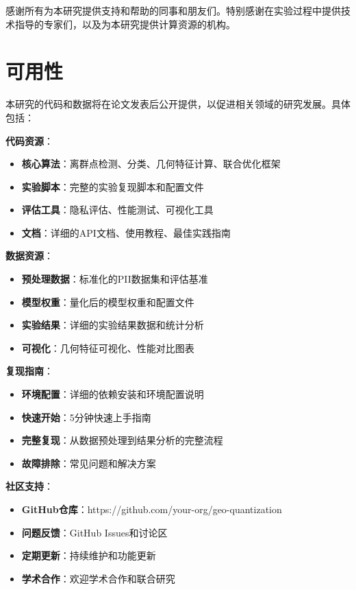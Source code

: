 感谢所有为本研究提供支持和帮助的同事和朋友们。特别感谢在实验过程中提供技术指导的专家们，以及为本研究提供计算资源的机构。

\section*{可用性}

本研究的代码和数据将在论文发表后公开提供，以促进相关领域的研究发展。具体包括：

\textbf{代码资源}：
\begin{itemize}
\item \textbf{核心算法}：离群点检测、分类、几何特征计算、联合优化框架
\item \textbf{实验脚本}：完整的实验复现脚本和配置文件
\item \textbf{评估工具}：隐私评估、性能测试、可视化工具
\item \textbf{文档}：详细的API文档、使用教程、最佳实践指南
\end{itemize}

\textbf{数据资源}：
\begin{itemize}
\item \textbf{预处理数据}：标准化的PII数据集和评估基准
\item \textbf{模型权重}：量化后的模型权重和配置文件
\item \textbf{实验结果}：详细的实验结果数据和统计分析
\item \textbf{可视化}：几何特征可视化、性能对比图表
\end{itemize}

\textbf{复现指南}：
\begin{itemize}
\item \textbf{环境配置}：详细的依赖安装和环境配置说明
\item \textbf{快速开始}：5分钟快速上手指南
\item \textbf{完整复现}：从数据预处理到结果分析的完整流程
\item \textbf{故障排除}：常见问题和解决方案
\end{itemize}

\textbf{社区支持}：
\begin{itemize}
\item \textbf{GitHub仓库}：https://github.com/your-org/geo-quantization
\item \textbf{问题反馈}：GitHub Issues和讨论区
\item \textbf{定期更新}：持续维护和功能更新
\item \textbf{学术合作}：欢迎学术合作和联合研究
\end{itemize}






